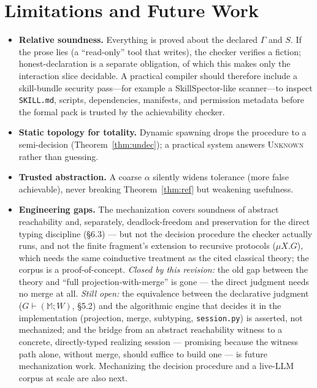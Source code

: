 \documentclass[11pt]{article}
\theoremstyle{plain}
\theoremstyle{definition}
\newcommand{\id}[1]{\texttt{#1}}
\newcommand{\MM}{\mathbb{M}}
\begin{document}
\section{Limitations and Future Work}
\begin{itemize}\setlength{\itemsep}{1pt}
\item \textbf{Relative soundness.} Everything is proved about the declared $\Gamma$
and $S$. If the prose lies (a ``read-only'' tool that writes), the checker verifies
a fiction; honest-declaration is a separate obligation, of which this makes only
the interaction slice decidable. A practical compiler should therefore include a
skill-bundle security pass---for example a SkillSpector-like scanner---to inspect
\id{SKILL.md}, scripts, dependencies, manifests, and permission metadata before the
formal pack is trusted by the achievability checker.
\item \textbf{Static topology for totality.} Dynamic spawning drops the procedure
to a semi-decision (Theorem~\ref{thm:undec}); a practical system answers
\textsc{Unknown} rather than guessing.
\item \textbf{Trusted abstraction.} A coarse $\alpha$ silently widens tolerance
(more false achievable), never breaking Theorem~\ref{thm:ref} but weakening
usefulness.
\item \textbf{Engineering gaps.} The mechanization covers soundness of abstract
reachability and, separately, deadlock-freedom and preservation for the direct
typing discipline (\S6.3) --- but not the decision procedure the checker actually
runs, and not the finite fragment's extension to recursive protocols
($\mu X.G$), which needs the same coinductive treatment as the cited classical
theory; the corpus is a proof-of-concept. \emph{Closed by this revision:} the old
gap between the theory and ``full projection-with-merge'' is gone --- the direct
judgment needs no merge at all. \emph{Still open:} the equivalence between the
declarative judgment ($G\vdash(\MM;W)$, \S5.2) and the algorithmic engine that
decides it in the implementation (projection, merge, subtyping, \id{session.py})
is asserted, not mechanized; and the bridge from an abstract reachability
witness to a concrete, directly-typed realizing session --- promising because the
witness path alone, without merge, should suffice to build one --- is future
mechanization work. Mechanizing the decision procedure and a live-LLM corpus at
scale are also next.
\end{itemize}
\end{document}

